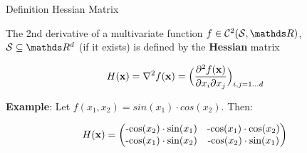 \begin{vbframe}{Definition Hessian Matrix}

The 2nd derivative of a multivariate function $f \in \mathcal{C}^2(\mathcal{S}, \R)$, $\mathcal{S}\subseteq \R^d$ (if it exists) is defined by the \textbf{Hessian} matrix

  \[ H(\mathbf{x}) =\nabla^2 f(\mathbf{x}) =
  \Bigl(\frac{\partial^2 f(\mathbf{x})}{\partial x_i \partial x_j}\Bigr)_{i,j=1\ldots d}\]
  
\lz 

\textbf{Example}: Let $f(x_1,x_2) = sin(x_1) \cdot cos(x_2)$. Then:

$$
H(\mathbf{x}) = \begin{pmatrix}
\text{-cos}(x_2)\cdot\text{sin}(x_1) & \text{-cos}(x_1)\cdot\text{cos}(x_2) 
\\ \text{-cos}(x_1)\cdot\text{sin}(x_2) & \text{-cos}(x_2)\cdot\text{sin}(x_1) 
\end{pmatrix}
$$


\end{vbframe}

